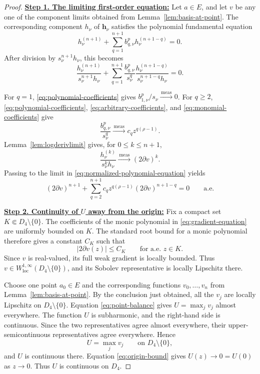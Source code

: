 \documentclass[12pt,letterpaper,reqno]{amsart}
\theoremstyle{definition}
\numberwithin{equation}{section}
\newcommand{\loc}{\mathrm{loc}}
\newcommand{\convmeas}{\xrightarrow{\,\mathrm{meas}\,}}
\newcommand{\hv}{\bm h}
\begin{document}
\begin{proof}

\medskip\noindent
\textbf{\underline{Step 1. The limiting first-order equation:}}
Let \(a\in E\), and let \(v\) be any one of the component limits
obtained from Lemma~\ref{lem:basis-at-point}. The corresponding
component \(h_\nu\) of \(\hv_\nu\) satisfies the polynomial
fundamental equation
\[
h_\nu^{(n+1)}
+
\sum_{q=1}^{n+1}
b_{q,\nu}^p h_\nu^{({n+1}-q)}
=
0.
\]
After division by \(s_\nu^{n+1}h_\nu\), this becomes
\begin{equation}\label{eq:normalized-polynomial-equation}
 \frac{h_\nu^{(n+1)}}{s_\nu^{n+1}h_\nu}
 +
 \sum_{q=1}^{n+1}
 \frac{b_{q,\nu}^p}{s_\nu^q}
 \frac{h_\nu^{({n+1}-q)}}{s_\nu^{{n+1}-q}h_\nu}
 =
 0.
\end{equation}

For \(q=1\), \eqref{eq:polynomial-coefficients} gives
\(b_{1,\nu}^p/s_\nu\convmeas0\). For \(q\geq2\),
\eqref{eq:polynomial-coefficients},
\eqref{eq:arbitrary-coefficients}, and
\eqref{eq:monomial-coefficients} give
\[
\frac{b_{q,\nu}^p}{s_\nu^q}
\convmeas
c_qz^{q(\rho-1)}.
\]
Lemma~\ref{lem:logderivlimit} gives, for
\(0\leq k\leq n+1\),
\[
\frac{h_\nu^{(k)}}{s_\nu^kh_\nu}
\convmeas
(2\partial v)^k.
\]
Passing to the limit in
\eqref{eq:normalized-polynomial-equation} yields
\begin{equation}\label{eq:gradient-equation}
 (2\partial v)^{n+1}
 +
 \sum_{q=2}^{n+1}
 c_qz^{q(\rho-1)}
 (2\partial v)^{{n+1}-q}
 =
 0
 \qquad\text{a.e.}
\end{equation}


\medskip\noindent
\textbf{\underline{Step 2. Continuity of \(U\) away from the origin:}}
Fix a compact set
\(K\Subset D_4\setminus\{0\}\).
The coefficients of the monic polynomial in
\eqref{eq:gradient-equation} are uniformly bounded on \(K\).
The standard root bound for a monic polynomial therefore gives a
constant \(C_K\) such that
\[
|2\partial v(z)|\leq C_K
\qquad\text{for a.e. }z\in K.
\]
Since \(v\) is real-valued, its full weak gradient is locally bounded.
Thus \(v\in W^{1,\infty}_{\loc}(D_4\setminus\{0\})\), and its
Sobolev representative is locally Lipschitz there.

Choose one point \(a_0\in E\) and the corresponding functions
\(v_0,\ldots,v_{n}\) from
Lemma~\ref{lem:basis-at-point}. By the conclusion just obtained, all
the \(v_j\) are locally Lipschitz on
\(D_4\setminus\{0\}\). Equation \eqref{eq:point-balance} gives
\(U=\max_jv_j\) almost everywhere. The function \(U\) is subharmonic,
and the right-hand side is continuous. Since the two representatives agree
almost everywhere, their upper-semicontinuous representatives agree
everywhere. Hence
\[
U=\max_jv_j
\qquad\text{on }D_4\setminus\{0\},
\]
and \(U\) is continuous there. Equation \eqref{eq:origin-bound} gives
\(U(z)\to0=U(0)\) as \(z\to0\). Thus \(U\) is continuous on \(D_4\).



\end{proof}
\end{document}
